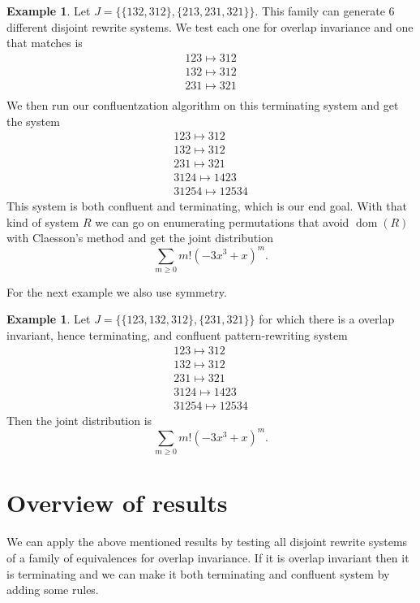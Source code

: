 \documentclass[a4paper, 11pt, english]{article}
\newcommand{\patternrule}{ \mapsto \!}
\theoremstyle{definition}
\newtheorem{example}[theorem]{Example}
\DeclareMathOperator{\dom}{dom}
\begin{document}
\begin{example}
Let $J=\{\{ 132, 312 \}, \{ 213, 231, 321 \}\}$. This family can generate 6
different disjoint rewrite systems. We test each one for overlap invariance and one that
matches is 
\[
    \begin{matrix}
        123 \patternrule 312 \\
        132 \patternrule 312 \\
        231 \patternrule 321 \\
    \end{matrix}
\]
We then run our confluentzation algorithm on this terminating system
and get the system
\[
    \begin{matrix}
        123 \patternrule 312 \\
        132 \patternrule 312 \\
        231 \patternrule 321 \\
        3124 \patternrule 1423 \\
        31254 \patternrule 12534
    \end{matrix}
\]
This system is both confluent and terminating, which is our end goal.
With that kind of system $R$ we can go on enumerating
permutations that avoid $\dom(R)$ with Claesson's method and get the joint distribution
\[
  \sum_{m \geq 0} m! (-3x^3 + x)^m.
\]
 
\end{example}

For the next example we also use symmetry.

\begin{example}
Let $J = \{ \{ 123, 132, 312 \}, \{ 231, 321 \} \}$ for which there is a overlap invariant, hence
terminating, and confluent pattern-rewriting system
\[
    \begin{matrix}
        123 \patternrule 312 \\
        132 \patternrule 312 \\
        231 \patternrule 321 \\
        3124 \patternrule 1423 \\
        31254 \patternrule 12534
    \end{matrix}
\]
Then the joint distribution is
\[
  \sum_{m \geq 0} m! (-3x^3 + x)^m.
\]

\end{example}

\section{Overview of results}
We can apply the above mentioned results by testing all disjoint rewrite systems of a
family of equivalences for overlap invariance. If it is overlap invariant then it is terminating and
we can make it both terminating and confluent system by adding some rules.
\end{document}
